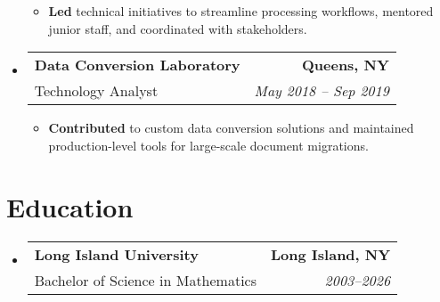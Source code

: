 \documentclass[a4paper]{article}
\makeatletter
\newcommand{\TwoRowSubheading}[4]{
  \item \begin{tabular*}{.95\textwidth}{@{}l @{\extracolsep{\fill}} r@{}}
    \textbf{#1} & \textbf{#2} \\
    {\color{gray}#3} & {\itshape #4} \\
  \end{tabular*}
}
\makeatother
\begin{document}
\begin{itemize}[leftmargin=*,label=]
\begin{itemize}[leftmargin=1em,rightmargin=1em,label=]
    \item \textbf{Led} technical initiatives to streamline processing workflows, mentored junior staff, and coordinated with stakeholders.
\end{itemize}

\TwoRowSubheading
{Data Conversion Laboratory}
{Queens, NY}
{Technology Analyst}
{May 2018 -- Sep 2019}

\begin{itemize}[leftmargin=1em,rightmargin=1em,label=]
    \item \textbf{Contributed} to custom data conversion solutions and maintained production-level tools for large-scale document migrations.
\end{itemize}

\end{itemize}

\section{Education}
\begin{itemize}[leftmargin=*]    
\TwoRowSubheading
{Long Island University}
{Long Island, NY}
{Bachelor of Science in Mathematics}
{2003--2026}
\end{itemize}
\end{document}
